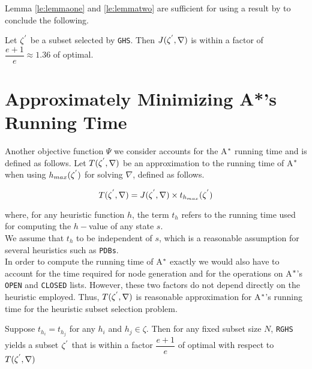 Lemma \ref{le:lemmaone} and \ref{le:lemmatwo} are sufficient for using a result by \cite{buchbinder2014submodular} to conclude the following.

\begin{theorem}
Let $\zeta\sp{'}$ be a subset selected by \texttt{GHS}. Then $J(\zeta\sp{'}, \nabla)$ is within a factor of $\dfrac{e+1}{e} \approx 1.36$ of optimal.
\label{th:theorem_one}
\end{theorem}

\section{Approximately Minimizing A*'s Running Time}
\noindent
Another objective function $\Psi$ we consider accounts for the A$\sp{*}$ running time and is defined as follows. Let $T(\zeta\sp{'},\nabla)$ be an approximation to the running time of A$\sp{*}$ when using $h_{max}(\zeta\sp{'})$ for solving $\nabla$, defined as follows.

\begin{equation}
T(\zeta\sp{'}, \nabla) = J(\zeta\sp{'},\nabla) \times t_{h_{max}}(\zeta\sp{'})
\label{eq:eq_time_solving}
\end{equation}

where, for any heuristic function $h$, the term $t_{h}$ refers to the running time used for computing the $h-$value of any state $s$. \\

We assume that $t_{h}$ to be independent of $s$, which is a reasonable assumption for several heuristics such as \texttt{PDBs}.\\

In order to compute the running time of A$\sp{*}$ exactly we would also have to account for the time required for node generation and for the operations on A$\sp{*}$'s \texttt{OPEN} and \texttt{CLOSED} lists. However, these two factors do not depend directly on the heuristic employed. Thus, $T(\zeta\sp{'},\nabla)$ is reasonable approximation for A$\sp{*}$'s running time for the heuristic subset selection problem.

\begin{theorem}
Suppose $t_{h_{i}} = t_{h_{j}}$ for any $h_{i}$ and $h_{j} \in \zeta$. Then for any fixed subset size $N$, \texttt{RGHS} yields a subset $\zeta\sp{'}$ that is within a factor $\dfrac{e+1}{e}$ of optimal with respect to $T(\zeta\sp{'},\nabla)$
\label{th:theorem_two}
\end{theorem}

